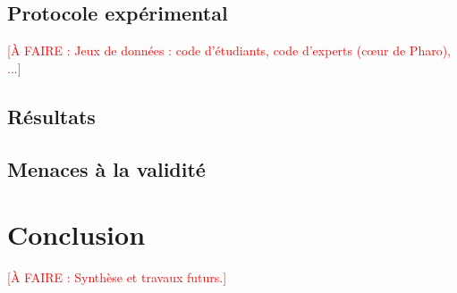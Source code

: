 \documentclass[11pt,a4paper]{report}
\newcommand{\todo}[1]{\textcolor{red}{[À FAIRE : #1]}}
\begin{document}
\section{Protocole expérimental}
\todo{Jeux de données : code d’étudiants, code d’experts (cœur de Pharo), ...}

\section{Résultats}
\section{Menaces à la validité}
\chapter{Conclusion}
\todo{Synthèse et travaux futurs.}
\end{document}
